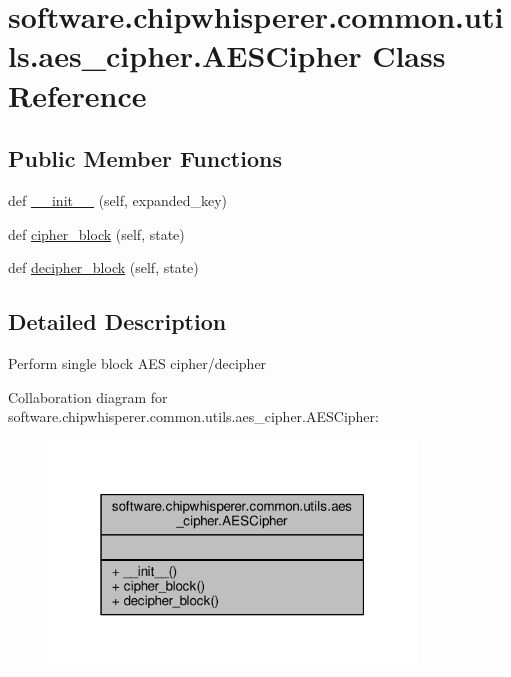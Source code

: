 \hypertarget{classsoftware_1_1chipwhisperer_1_1common_1_1utils_1_1aes__cipher_1_1AESCipher}{}\section{software.\+chipwhisperer.\+common.\+utils.\+aes\+\_\+cipher.\+A\+E\+S\+Cipher Class Reference}
\label{classsoftware_1_1chipwhisperer_1_1common_1_1utils_1_1aes__cipher_1_1AESCipher}
\subsection*{Public Member Functions}
\begin{DoxyCompactItemize}
\item 
def \hyperlink{classsoftware_1_1chipwhisperer_1_1common_1_1utils_1_1aes__cipher_1_1AESCipher_aed6a2ba69ca2ea0a9003d85d080a8848}{\+\_\+\+\_\+init\+\_\+\+\_\+} (self, expanded\+\_\+key)
\item 
def \hyperlink{classsoftware_1_1chipwhisperer_1_1common_1_1utils_1_1aes__cipher_1_1AESCipher_a29b33c0f6edbc2a29d0b68fcfcfaa6d3}{cipher\+\_\+block} (self, state)
\item 
def \hyperlink{classsoftware_1_1chipwhisperer_1_1common_1_1utils_1_1aes__cipher_1_1AESCipher_af893b3c3a6d04d108b4f45158463e95f}{decipher\+\_\+block} (self, state)
\end{DoxyCompactItemize}


\subsection{Detailed Description}
\begin{DoxyVerb}Perform single block AES cipher/decipher\end{DoxyVerb}
 

Collaboration diagram for software.\+chipwhisperer.\+common.\+utils.\+aes\+\_\+cipher.\+A\+E\+S\+Cipher\+:\nopagebreak
\begin{figure}[H]
\begin{center}
\leavevmode
\includegraphics[width=277pt]{de/d74/classsoftware_1_1chipwhisperer_1_1common_1_1utils_1_1aes__cipher_1_1AESCipher__coll__graph}
\end{center}
\end{figure}


